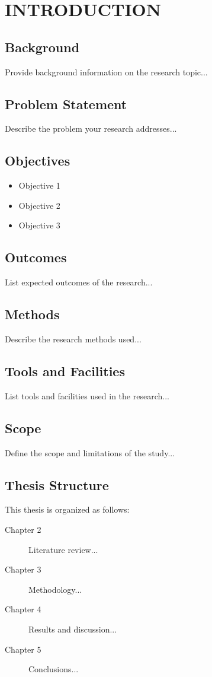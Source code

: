 
\chapter{INTRODUCTION}

\ifpdf
    \graphicspath{{introduction/figures/PNG}{introduction/figures/PDF}{introduction/figures}}
\else
    \graphicspath{{introduction/figures/EPS}{introduction/figures}}
\fi

\section{Background}
Provide background information on the research topic...

\section{Problem Statement}
Describe the problem your research addresses...

\section{Objectives}
\begin{itemize}
    \item Objective 1
    \item Objective 2
    \item Objective 3
\end{itemize}

\section{Outcomes}
List expected outcomes of the research...

\section{Methods}
Describe the research methods used...

\section{Tools and Facilities}
List tools and facilities used in the research...

\section{Scope}
Define the scope and limitations of the study...

\section{Thesis Structure}
This thesis is organized as follows:
\begin{description}
    \item[Chapter 2] Literature review...
    \item[Chapter 3] Methodology...
    \item[Chapter 4] Results and discussion...
    \item[Chapter 5] Conclusions...
\end{description}
